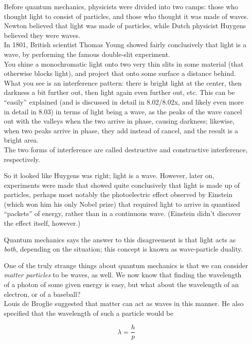 \documentclass[8.01x]{subfiles}
\begin{document}
Before quantum mechanics, physicists were divided into two camps: those who thought light to consist of particles, and those who thought it was made of waves.\\
Newton believed that light was made of particles, while Dutch physicist Huygens believed they were waves.\\
In 1801, British scientist Thomas Young showed fairly conclusively that light is a wave, by performing the famous double-slit experiment.\\
You shine a monochromatic light onto two very thin slits in some material (that otherwise blocks light), and project that onto some surface a distance behind.\\
What you see is an interference pattern: there is bright light at the center, then darkness a bit further out, then light again even further out, etc. This can be ``easily'' explained (and is discussed in detail in 8.02/8.02x, and likely even more in detail in 8.03) in terms of light being a wave, as the peaks of the wave cancel out with the valleys when the two arrive in phase, causing darkness; likewise, when two peaks arrive in phase, they add instead of cancel, and the result is a bright area.\\
The two forms of interference are called destructive and constructive interference, respectively.

So it looked like Huygens was right; light is a wave. However, later on, experiments were made that showed quite conclusively that light is made up of particles, perhaps most notably the photoelectric effect observed by Einstein (which won him his only Nobel prize) that required light to arrive in quantized ``packets'' of energy, rather than in a continuous wave. (Einstein didn't discover the effect itself, however.)

Quantum mechanics says the answer to this disagreement is that light acts as \emph{both}, depending on the situation; this concept is known as wave-particle duality.

One of the truly strange things about quantum mechanics is that we can consider \emph{matter particles} to be waves, as well. We now know that finding the wavelength of a photon of some given energy is easy, but what about the wavelength of an electron, or of a baseball?\\
Louis de Broglie suggested that matter can act as waves in this manner. He also specified that the wavelength of such a particle would be

\begin{equation}
\lambda = \frac{h}{p}
\end{equation}
\end{document}
